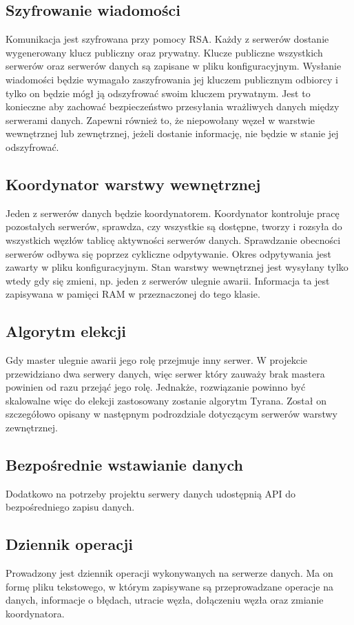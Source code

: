 \subsection{Szyfrowanie wiadomości}
Komunikacja jest szyfrowana przy pomocy RSA. Każdy z serwerów dostanie wygenerowany klucz publiczny oraz prywatny. Klucze publiczne wszystkich serwerów oraz serwerów danych są zapisane w pliku konfiguracyjnym. Wysłanie wiadomości będzie wymagało zaszyfrowania jej kluczem publicznym odbiorcy i tylko on będzie mógł ją odszyfrować swoim kluczem prywatnym. Jest to konieczne aby zachować bezpieczeństwo przesyłania wrażliwych danych między serwerami danych. Zapewni również to, że niepowołany węzeł w warstwie wewnętrznej lub zewnętrznej, jeżeli dostanie informację, nie będzie w stanie jej odszyfrować.

\subsection{Koordynator warstwy wewnętrznej}
Jeden z serwerów danych będzie koordynatorem. Koordynator kontroluje pracę pozostałych serwerów, sprawdza, czy wszystkie są dostępne, tworzy i rozsyła do wszystkich węzłów tablicę aktywności serwerów danych. Sprawdzanie obecności serwerów odbywa się poprzez cykliczne odpytywanie. Okres odpytywania jest zawarty w pliku konfiguracyjnym. Stan warstwy wewnętrznej jest wysyłany tylko wtedy gdy się zmieni, np. jeden z serwerów ulegnie awarii. Informacja ta jest zapisywana w pamięci RAM w przeznaczonej do tego klasie.

\subsection{Algorytm elekcji}
Gdy master ulegnie awarii jego rolę przejmuje inny serwer. W projekcie przewidziano dwa serwery danych, więc serwer który zauważy brak mastera powinien od razu przejąć jego rolę. Jednakże, rozwiązanie powinno być skalowalne więc do elekcji zastosowany zostanie algorytm Tyrana. Został on szczegółowo opisany w następnym podrozdziale dotyczącym serwerów warstwy zewnętrznej.

\subsection{Bezpośrednie wstawianie danych}
Dodatkowo na potrzeby projektu serwery danych udostępnią API do bezpośredniego zapisu danych.

\subsection{Dziennik operacji}
Prowadzony jest dziennik operacji wykonywanych na serwerze danych. Ma on formę pliku tekstowego, w którym zapisywane są przeprowadzane operacje na danych, informacje o błędach, utracie węzła, dołączeniu węzła oraz zmianie koordynatora.


